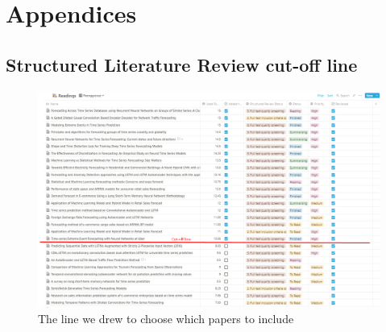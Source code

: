 
\chapter{Appendices}
\label{cha:appendices}

\section{Structured Literature Review cut-off line}
\label{cha:slr-cut-off-line}

\begin{figure}[h!]
  \centering
  \includegraphics[width=\textwidth]{./figs/illustrations/LSR-cut-off-line.png}
  \hfill
  \caption{The line we drew to choose which papers to include}
  \label{fig:slr-cut-off-line}
\end{figure}


